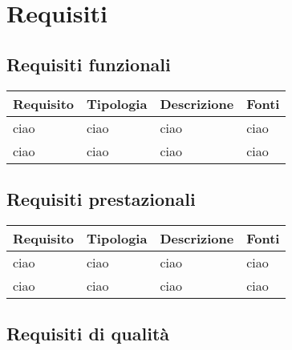 \section{Requisiti }

\subsection{Requisiti funzionali }

			\begin{table}[h]
			\begin{longtabu}{ p{1.5cm} | p{2cm} | p{5cm} | p{2cm}}
		
			 \textbf{Requisito} &  \textbf{Tipologia} 
			&  \textbf{Descrizione} &  \textbf{Fonti} \\ \hline
			
				ciao & ciao & ciao & ciao\\ \hline
				ciao & ciao & ciao & ciao \\ \hline
  
  			\end{longtabu}
			\end{table}  

\subsection{Requisiti prestazionali }

			\begin{table}[h]
			\begin{longtabu}{ p{1.5cm} | p{2cm} | p{5cm} | p{2cm}}
		
			 \textbf{Requisito} &  \textbf{Tipologia} 
			&  \textbf{Descrizione} &  \textbf{Fonti} \\ \hline
			
				ciao & ciao & ciao & ciao\\ \hline
				ciao & ciao & ciao & ciao \\ \hline
  
  			\end{longtabu}
			\end{table}  
			
\subsection{Requisiti di qualità }

